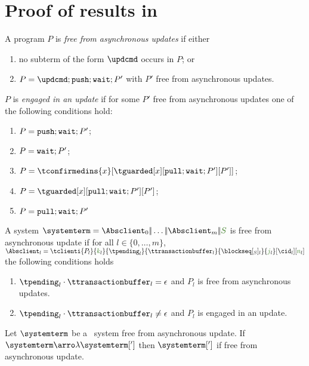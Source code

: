 
\section{Proof of results in }

\begin{definition}
A program $P$ is {\em free from asynchronous updates} if either
\begin{enumerate}
\item  no subterm of the form $\updcmd$ occurs in $P$; or 
\item  $P=\updcmd;\pushcmd;\waitcmd;P'$ with $P'$ free from asynchronous updates.
\end{enumerate}

$P$ is {\em engaged in an update} if for some $P'$ free from asynchronous updates 
one of the following conditions hold:
\begin{enumerate}
\item $P = {\tt push};{\tt wait};P'$;
\item $P = {\tt wait};P'$; 
\item $P = {\tconfirmedins{x}[{\tguarded[x][\pullcmd;\waitcmd;P'][P']}]}$;
\item $P = \tguarded[x][\pullcmd;\waitcmd;P'][P']$;
\item $P = {\tt pull};{\tt wait};P' $  
\end{enumerate}

A system $\systemterm =  \Absclient_0\bigpar \ldots\bigpar \Absclient_m\bigpar\queuemessage$
is free from asynchronous update if for all  $l\in \{0,\ldots,m\}$, 
$\Absclient_l = \tclienti{\tprogram_l}{\tknown_l}{\tpending_l}{\ttransactionbuffer_l}{\tsent_l}{\treceivebuffer_l}[\cid_l][\trounds_l]$ 
 the following conditions holds
 \begin{enumerate}
  \item $\tpending_l\cdot{\ttransactionbuffer_l} = \epsilon$ and $P_l$ is free from asynchronous updates.
  \item $\tpending_l\cdot{\ttransactionbuffer_l} \neq \epsilon$ and $P_l$ is engaged in an update.
\end{enumerate}
\end{definition}
 

\begin{lemma}\label{lemma:empty_queue} 
Let $\systemterm$  be a \gsp\ system free from asynchronous update. If $\systemterm\arroi{\lambda}\systemterm[']$ 
then $\systemterm[']$ if free from asynchronous update. 
\end{lemma}


